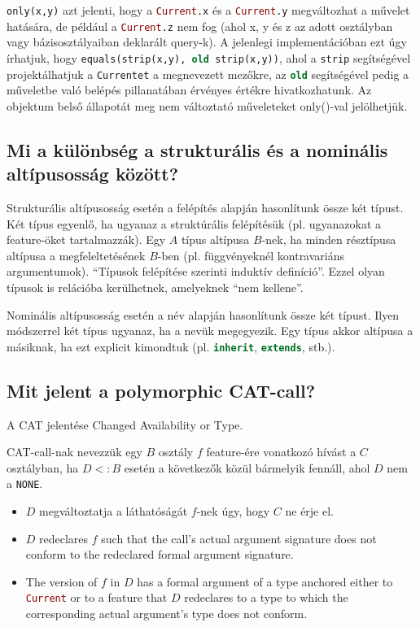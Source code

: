 	\lstinline[language=Eiffel]|only(x,y)| azt jelenti, hogy a \lstinline[language=Eiffel]|Current.x| és a \lstinline[language=Eiffel]|Current.y| megváltozhat a művelet hatására, de például a \lstinline[language=Eiffel]|Current.z| nem fog (ahol x, y és z az adott osztályban vagy bázisosztályaiban deklarált query-k). A jelenlegi implementációban ezt úgy írhatjuk, hogy \lstinline[language=Eiffel]|equals(strip(x,y), old strip(x,y))|, ahol a \lstinline[language=Eiffel]|strip| segítségével projektálhatjuk a \lstinline[language=Eiffel]|Currentet| a megnevezett mezőkre, az \lstinline[language=Eiffel]|old| segítségével pedig a műveletbe való belépés pillanatában érvényes értékre hivatkozhatunk. Az objektum belső állapotát meg nem változtató műveleteket only()-val jelölhetjük.
	
\subsection{ Mi a különbség a strukturális és a nominális altípusosság között? }
	Strukturális altípusosság esetén a felépítés alapján hasonlítunk össze két típust. Két típus egyenlő, ha ugyanaz a struktúrális felépítésük (pl. ugyanazokat a feature-öket tartalmazzák). Egy $A$ típus altípusa $B$-nek, ha minden résztípusa altípusa a megfeleltetésének $B$-ben (pl. függvényeknél kontravariáns argumentumok). “Típusok felépítése szerinti induktív definíció”. Ezzel olyan típusok is relációba kerülhetnek, amelyeknek “nem kellene”.
	
	Nominális altípusosság esetén a név alapján hasonlítunk össze két típust. Ilyen módszerrel két típus ugyanaz, ha a nevük megegyezik. Egy típus akkor altípusa a másiknak, ha ezt explicit kimondtuk (pl. \lstinline[language=Eiffel]|inherit|, \lstinline[language=Java]|extends|, stb.).
	
\subsection{ Mit jelent a polymorphic CAT-call? }
	A CAT jelentése Changed Availability or Type.
	
	CAT-call-nak nevezzük egy $B$ osztály $f$ feature-ére vonatkozó hívást a $C$ osztályban, ha $D<:B$ esetén a következők közül bármelyik fennáll, ahol $D$ nem a \lstinline[language=Eiffel]|NONE|.
	\begin{itemize}
		\item $D$ megváltoztatja a láthatóságát $f$-nek úgy, hogy $C$ ne érje el.
		\item $D$ redeclares $f$ such that the call's actual argument signature does not conform to the redeclared formal argument signature.
		\item The version of $f$ in $D$ has a formal argument of a type anchored either to \lstinline[language=Eiffel]|Current| or to a feature that $D$ redeclares to a type to which the corresponding actual argument's type does not conform.
	\end{itemize}

